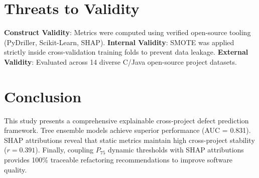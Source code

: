 \documentclass[10pt,journal,compsoc]{IEEEtran}
\begin{document}
\section{Threats to Validity}
\textbf{Construct Validity}: Metrics were computed using verified open-source tooling (PyDriller, Scikit-Learn, SHAP).
\textbf{Internal Validity}: SMOTE was applied strictly inside cross-validation training folds to prevent data leakage.
\textbf{External Validity}: Evaluated across 14 diverse C/Java open-source project datasets.

\section{Conclusion}
This study presents a comprehensive explainable cross-project defect prediction framework. Tree ensemble models achieve superior performance (AUC = 0.831). SHAP attributions reveal that static metrics maintain high cross-project stability ($r = 0.391$). Finally, coupling $P_{75}$ dynamic thresholds with SHAP attributions provides 100\% traceable refactoring recommendations to improve software quality.


\end{document}
